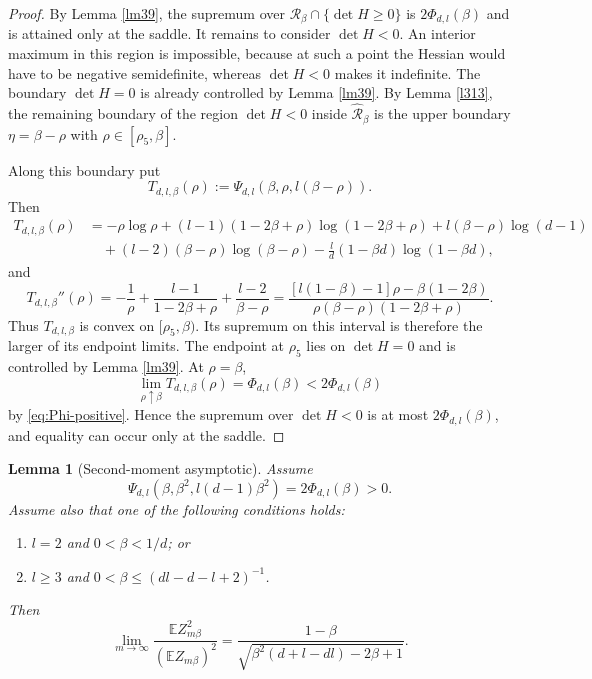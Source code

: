\documentclass[11pt]{amsart}
\theoremstyle{plain}
\newtheorem{lemma}[theorem]{Lemma}
\numberwithin{equation}{section}
\numberwithin{theorem}{section}
\numberwithin{figure}{section}
\begin{document}
\begin{proof}
By Lemma \ref{lm39}, the supremum over $\mathcal R_\beta\cap\{\det H\geq0\}$ is
$2\Phi_{d,l}(\beta)$ and is attained only at the saddle.  It remains to consider
$\det H<0$.  An interior maximum in this region is impossible, because at such a point
the Hessian would have to be negative semidefinite, whereas $\det H<0$ makes it
indefinite.  The boundary $\det H=0$ is already controlled by Lemma \ref{lm39}.  By
Lemma \ref{l313}, the remaining boundary of the region $\det H<0$ inside
$\widehat{\mathcal R}_\beta$ is the upper boundary $\eta=\beta-\rho$ with
$\rho\in[\rho_5,\beta]$.

Along this boundary put
\begin{equation}
T_{d,l,\beta}(\rho):=\Psi_{d,l}(\beta,\rho,l(\beta-\rho)).
\label{dtr}
\end{equation}
Then
\begin{align*}
T_{d,l,\beta}(\rho)
&=-\rho\log\rho+(l-1)(1-2\beta+\rho)\log(1-2\beta+\rho)
+l(\beta-\rho)\log(d-1)\\
&\quad +(l-2)(\beta-\rho)\log(\beta-\rho)
-\frac ld(1-\beta d)\log(1-\beta d),
\end{align*}
and
\begin{equation}
T_{d,l,\beta}''(\rho)
=-\frac1\rho+\frac{l-1}{1-2\beta+\rho}+\frac{l-2}{\beta-\rho}
=\frac{[l(1-\beta)-1]\rho-\beta(1-2\beta)}
{\rho(\beta-\rho)(1-2\beta+\rho)}.
\label{dtr2}
\end{equation}
Thus $T_{d,l,\beta}$ is convex on $[\rho_5,\beta)$.  Its supremum on this interval is
therefore the larger of its endpoint limits.  The endpoint at $\rho_5$ lies on
$\det H=0$ and is controlled by Lemma \ref{lm39}.  At $\rho=\beta$,
\[
\lim_{\rho\uparrow\beta}T_{d,l,\beta}(\rho)=\Phi_{d,l}(\beta)<2\Phi_{d,l}(\beta)
\]
by \eqref{eq:Phi-positive}.  Hence the supremum over $\det H<0$ is at most
$2\Phi_{d,l}(\beta)$, and equality can occur only at the saddle.
\end{proof}

\begin{lemma}[Second-moment asymptotic]\label{l08}
Assume
\begin{equation}
\Psi_{d,l}(\beta,\beta^2,l(d-1)\beta^2)=2\Phi_{d,l}(\beta)>0.
\label{bm}
\end{equation}
Assume also that one of the following conditions holds:
\begin{enumerate}
\item $l=2$ and $0<\beta<1/d$; or
\item $l\geq3$ and $0<\beta\leq (dl-d-l+2)^{-1}$.
\end{enumerate}
Then
\begin{equation}
\lim_{m\to\infty}
\frac{\mathbb E Z_{m\beta}^2}{(\mathbb E Z_{m\beta})^2}
=\frac{1-\beta}{\sqrt{\beta^2(d+l-dl)-2\beta+1}}.
\label{cm}
\end{equation}
\end{lemma}
\end{document}
